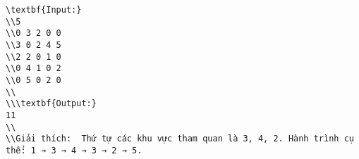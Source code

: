 \begin{verbatim}
\textbf{Input:}
\\5
\\0 3 2 0 0
\\3 0 2 4 5
\\2 2 0 1 0
\\0 4 1 0 2
\\0 5 0 2 0
\\
\\\textbf{Output:}
11
\\
\\Giải thích:  Thứ tự các khu vực tham quan là 3, 4, 2. Hành trình cụ thể: 1 → 3 → 4 → 3 → 2 → 5.\end{verbatim}